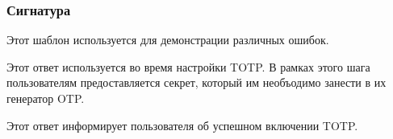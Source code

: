 \subsubsection{Сигнатура\label{signature}}%
\label{page-FPauth-strategies-module-FPauth+u+strategies-module-TOTP-module-Make+u+HTML+u+Responses-val-response+u+error}\begin{ocamlindent}Этот шаблон используется для демонстрации различных ошибок.\end{ocamlindent}%
\medbreak
\label{page-FPauth-strategies-module-FPauth+u+strategies-module-TOTP-module-Make+u+HTML+u+Responses-val-response+u+secret}\begin{ocamlindent}Этот ответ используется во время настройки TOTP. В рамках этого шага пользователям предоставляется секрет, который им необъодимо занести в их генератор OTP.\end{ocamlindent}%
\medbreak
\label{page-FPauth-strategies-module-FPauth+u+strategies-module-TOTP-module-Make+u+HTML+u+Responses-val-response+u+enabled}\begin{ocamlindent}Этот ответ информирует пользователя об успешном включении TOTP.\end{ocamlindent}%
\medbreak


